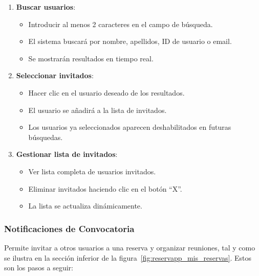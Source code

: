 \begin{enumerate}
   \item \textbf{Buscar usuarios}:
   \begin{itemize}
      \item Introducir al menos 2 caracteres en el campo de búsqueda.
      \item El sistema buscará por nombre, apellidos, ID de usuario o email.
	  \item Se mostrarán resultados en tiempo real.
   \end{itemize}
   \item \textbf{Seleccionar invitados}:
   \begin{itemize}
      \item Hacer clic en el usuario deseado de los resultados.
      \item El usuario se añadirá a la lista de invitados.
      \item Los usuarios ya seleccionados aparecen deshabilitados en futuras búsquedas.
   \end{itemize}
   \item \textbf{Gestionar lista de invitados}:
   \begin{itemize}
      \item Ver lista completa de usuarios invitados.
      \item Eliminar invitados haciendo clic en el botón ``X''.
      \item La lista se actualiza dinámicamente.
   \end{itemize}
\end{enumerate}

\subsubsection{Notificaciones de Convocatoria}
Permite invitar a otros usuarios a una reserva y organizar reuniones, tal y como se ilustra en la sección inferior de la figura~\ref{fig:reservapp_mis_reservas}. Estos son los pasos a seguir:

